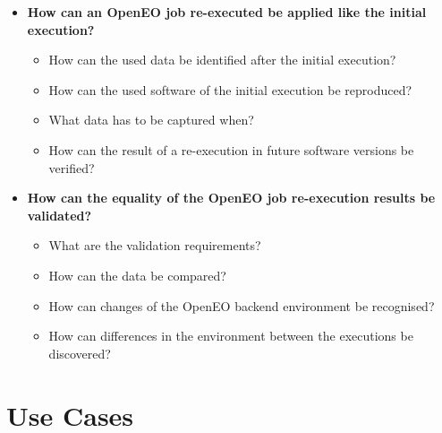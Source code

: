 \documentclass[draft,final]{vutinfth} %
\begin{document}
\begin{itemize}
	\item \textbf{How can an OpenEO job re-executed be applied like the initial execution?}
	\begin{itemize}
		\item How can the used data be identified after the initial execution?
		\item How can the used software of the initial execution be reproduced?
		\item What data has to be captured when?
		\item How can the result of a re-execution in future software versions be verified?
	\end{itemize}
	\item \textbf{How can the equality of the OpenEO job re-execution results be validated?}
	\begin{itemize}
		\item What are the validation requirements?
		\item How can the data be compared?
		\item How can changes of the OpenEO backend environment be recognised?
		\item How can differences in the environment between the executions be discovered?
	\end{itemize}
\end{itemize}

\section{Use Cases}\label{Use Cases}
\end{document}
